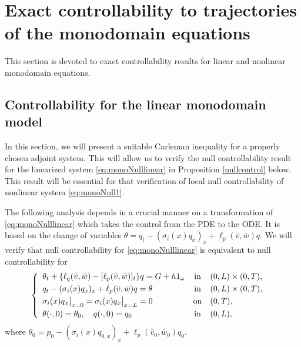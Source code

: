 \documentclass[10pt]{article}
\def\dis{\displaystyle}
\def\\Phivec{\mathbf{\Phi}}
\begin{document}

 \section{Exact controllability to  trajectories of the monodomain equations}\label{Section:monodomain}

  This section is devoted to exact controllability results for linear and nonlinear monodomain equations.


 \subsection{Controllability for the linear monodomain model}\label{Section:linearmonodomain}


    In this section, we will present a suitable Carleman inequality for a properly chosen adjoint system.
    { This will allow us  to verify the null controllability result for the linearized system  \eqref{eq:monoNulllinear} in Proposition \ref{nullcontrol} below. This result will be essential for that verification of local null controllability of nonlinear system \eqref{eq:monoNull1}.}

    The following analysis depends in a crucial manner on a transformation of \eqref{eq:monoNulllinear}  which takes the  control from the PDE to the ODE. { It is based on the change of variables $\theta =q_t-(\sigma_i(x)q_x)_x+\ell_p(\bar v,\bar w)q$}.
 We will verify that null controllability for  \eqref{eq:monoNulllinear} is equivalent to
    null controllability for
\begin{equation}\label{eq:monoNulllinear1}
    \!\!\!\!\!\left\{
        \begin{array}{lcl}
            \theta_t+\{\ell_q(\bar v,\bar w)-[\ell_p(\bar v,\bar w)]_t\} q
         = G+h1_{\omega}         &  \mbox{in}&    (0,L) \times (0,T),        \\
            \noalign{\smallskip}\dis
            q_t-(\sigma_i(x)q_x)_x+\ell_p(\bar v,\bar w)q=\theta &\mbox{in}&(0,L) \times (0,T),    \\
            \noalign{\smallskip}\dis
            \sigma_i(x)q_x\big|_{x=0}=\sigma_i(x)q_x\big|_{x=L} = 0                & \mbox{on}& (0,T),    \\
            \noalign{\smallskip}\dis
            \theta(\cdot,0) =\theta_0,\quad q(\cdot,0) =q_0 & \mbox{in}&    (0,L),
        \end{array}
    \right.
\end{equation}
    where $\theta_0=p_0-(\sigma_i (x)q_{0,x})_x +\ell_p(\bar v_0,\bar w_0)q_0$.
\end{document}
